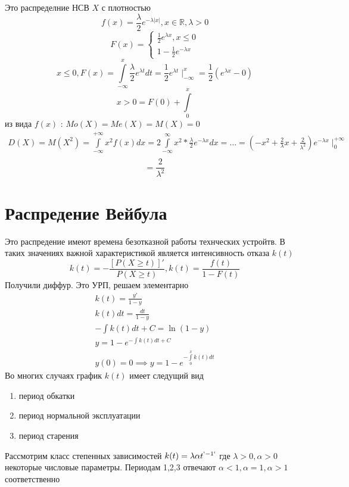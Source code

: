 \documentclass[14pt]{extarticle}
\begin{document}
 Это распределние НСВ $X$ с плотностью
  \begin{equation}
 	f(x) = \frac{\lambda}{2} e^{-\lambda |x|}, x \in \mathbb{R},\lambda > 0
 \end{equation}
 \begin{equation}
 	F(x) =
	\begin{cases}
		\frac{1}{2}e^{\lambda x} , x \le 0\\
		1 - \frac{1}{2}e^{-\lambda x}
	\end{cases}
 \end{equation}
 \begin{equation}
	 x\le  0,
 	F(x) = \int\limits_{-\infty}^{x}   \frac{\lambda}{2} e^{\lambda t} dt = \frac{1}{2} e^{\lambda t} \mid_{-\infty}^{x} = \frac{1}{2}(e^{\lambda x} - 0)
 \end{equation}
 \begin{equation}
 	x > 0 =  F(0)  + \int\limits_{0}^{x}
 \end{equation}
 из вида $f(x)$ :  $Mo(X) = Me(X) = M(X) = 0$
 \begin{eqnarray}
 	D(X) = M(X^2) = 
	\int\limits_{-\infty}^{+\infty}  x^2 f(x) dx = 
	2 \int\limits_{-\infty}^{\infty} x^2 * \frac{\lambda}{2} e^{-\lambda x} dx = \dots = (- x^2 +\frac{2}{\lambda} x
	+ \frac{2}{\lambda^2}) e^{-\lambda x} \mid_{0}^{+\infty}\\
 \end{eqnarray}
 \begin{equation}
  = \frac{2}{\lambda^2}
 \end{equation}
 \section{Распредение Вейбула}
 Это распредение имеют времена безотказной работы технческих устройтв.
 В таких значениях важной характеристикой является интенсивность отказа $k(t)$ 
  \begin{equation}
	  k(t) = - \frac{ [P(X \ge  t)]'}{P(X \ge  t)}, k(t) = \frac{f(t)}{1 - F(t)}
 \end{equation}
 Получили диффур. Это УРП, решаем элементарно
 \begin{eqnarray}
 	k(t) = \frac{y'}{1 - y}\\
	k(t) dt = \frac{dt}{1 -y}\\
	-\int k(t)dt + C = \ln{( 1-y )}\\
	y = 1 - e^{-\int k(t) dt + C}\\
	y(0) = 0 \implies y = 1 -e^{-\int\limits_{0}^{x} k(t)dt }
 \end{eqnarray}
 Во многих случаях график $k(t)$ имеет следущий вид
  \begin{enumerate}
 	\item период обкатки
	\item период нормальной эксплуатации
	\item период старения
 \end{enumerate}
 Рассмотрим класс степенных зависимостей $k(t)=\lambda \alpha t^{`-1`}$ где $\lambda > 0 , \alpha > 0$ некоторые числовые параметры.
 Периодам 1,2,3 отвечают  $\alpha < 1,\alpha =1, \alpha>1$ соответственно
\end{document}
